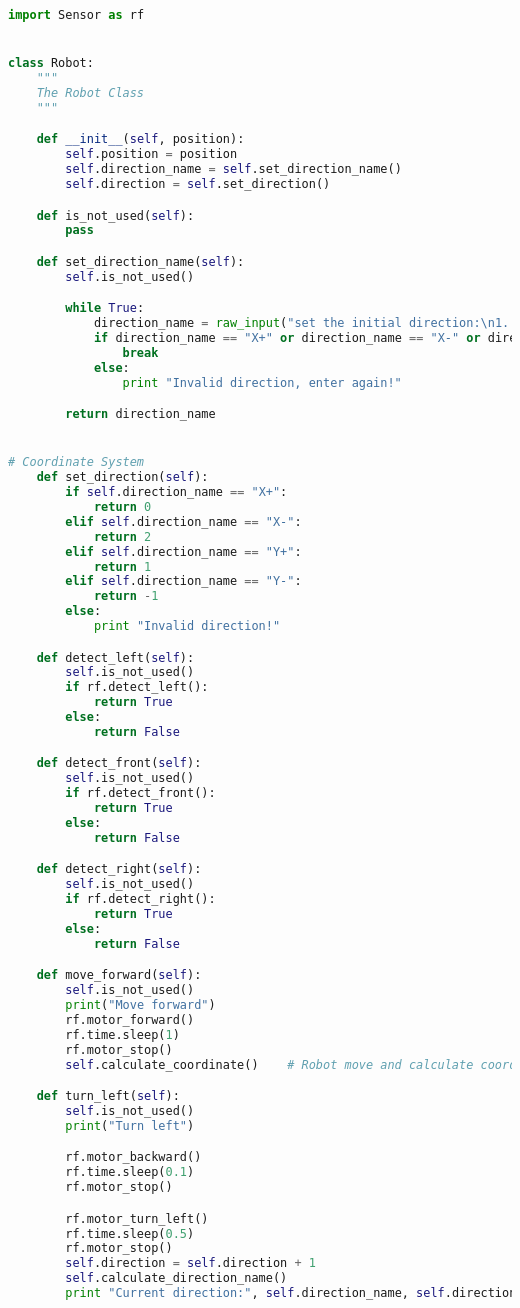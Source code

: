 \documentclass[11pt,times,oneside,openright,hardcopy]{eeereport}
\begin{document}
\begin{lstlisting}[language=Python]
import Sensor as rf


class Robot:
    """
    The Robot Class
    """

    def __init__(self, position):
        self.position = position
        self.direction_name = self.set_direction_name()
        self.direction = self.set_direction()

    def is_not_used(self):
        pass

    def set_direction_name(self):
        self.is_not_used()

        while True:
            direction_name = raw_input("set the initial direction:\n1. X+\n2. X-\n3. Y+\n4. Y-\n")
            if direction_name == "X+" or direction_name == "X-" or direction_name == "Y+" or direction_name == "Y-":
                break
            else:
                print "Invalid direction, enter again!"

        return direction_name


# Coordinate System
    def set_direction(self):
        if self.direction_name == "X+":
            return 0
        elif self.direction_name == "X-":
            return 2
        elif self.direction_name == "Y+":
            return 1
        elif self.direction_name == "Y-":
            return -1
        else:
            print "Invalid direction!"

    def detect_left(self):
        self.is_not_used()
        if rf.detect_left():
            return True
        else:
            return False

    def detect_front(self):
        self.is_not_used()
        if rf.detect_front():
            return True
        else:
            return False

    def detect_right(self):
        self.is_not_used()
        if rf.detect_right():
            return True
        else:
            return False

    def move_forward(self):
        self.is_not_used()
        print("Move forward")
        rf.motor_forward()
        rf.time.sleep(1)
        rf.motor_stop()
        self.calculate_coordinate()    # Robot move and calculate coordinate

    def turn_left(self):
        self.is_not_used()
        print("Turn left")

        rf.motor_backward()
        rf.time.sleep(0.1)
        rf.motor_stop()

        rf.motor_turn_left()
        rf.time.sleep(0.5)
        rf.motor_stop()
        self.direction = self.direction + 1
        self.calculate_direction_name()
        print "Current direction:", self.direction_name, self.direction


\end{lstlisting}
\end{document}
